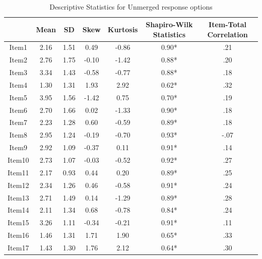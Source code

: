 \clearpage
\makeatletter
\efloat@restorefloats
\makeatother


\begin{appendix}
\section{}
\begin{table}[h]

\begin{center}
\begin{threeparttable}

\caption{\label{tab:tabDesAppB-25}Descriptive Statistics for Unmerged response options}

\begin{tabular}{ccccccc}
\toprule
 & \multicolumn{1}{c}{Mean} & \multicolumn{1}{c}{SD} & \multicolumn{1}{c}{Skew} & \multicolumn{1}{c}{Kurtosis} & \multicolumn{1}{c}{Shapiro-Wilk Statistics} & \multicolumn{1}{c}{Item-Total Correlation}\\
\midrule
Item1 & 2.16 & 1.51 & 0.49 & -0.86 & 0.90* & .21\\
Item2 & 2.76 & 1.75 & -0.10 & -1.42 & 0.88* & .20\\
Item3 & 3.34 & 1.43 & -0.58 & -0.77 & 0.88* & .18\\
Item4 & 1.30 & 1.31 & 1.93 & 2.92 & 0.62* & .32\\
Item5 & 3.95 & 1.56 & -1.42 & 0.75 & 0.70* & .19\\
Item6 & 2.70 & 1.66 & 0.02 & -1.33 & 0.90* & .18\\
Item7 & 2.23 & 1.28 & 0.60 & -0.59 & 0.89* & .18\\
Item8 & 2.95 & 1.24 & -0.19 & -0.70 & 0.93* & -.07\\
Item9 & 2.92 & 1.09 & -0.37 & 0.11 & 0.91* & .14\\
Item10 & 2.73 & 1.07 & -0.03 & -0.52 & 0.92* & .27\\
Item11 & 2.17 & 0.93 & 0.44 & 0.20 & 0.89* & .25\\
Item12 & 2.34 & 1.26 & 0.46 & -0.58 & 0.91* & .24\\
Item13 & 2.71 & 1.49 & 0.14 & -1.29 & 0.89* & .28\\
Item14 & 2.11 & 1.34 & 0.68 & -0.78 & 0.84* & .24\\
Item15 & 3.26 & 1.11 & -0.34 & -0.21 & 0.91* & .11\\
Item16 & 1.46 & 1.31 & 1.71 & 1.90 & 0.65* & .33\\
Item17 & 1.43 & 1.30 & 1.76 & 2.12 & 0.64* & .30\\

\end{tabular}
\end{threeparttable}
\end{center}
\end{table}
\end{appendix}
